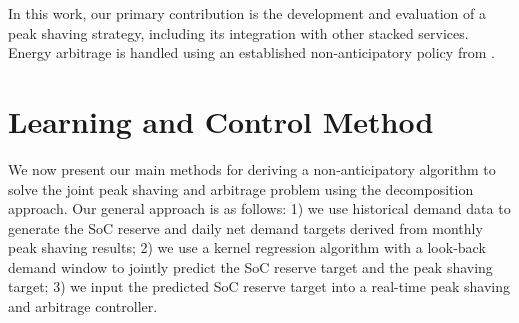 \documentclass[conference]{IEEEtran}
\begin{document}




In this work, our primary contribution is the development and evaluation of a peak shaving strategy, including its integration with other stacked services. Energy arbitrage is handled using an established non-anticipatory policy from \cite{baker2023transferable}.

\section{Learning and Control Method}\label{numerical_methods}
We now present our main methods for deriving a non-anticipatory algorithm to solve the joint peak shaving and arbitrage problem using the decomposition approach. Our general approach is as follows: 1) we use historical demand data to generate the SoC reserve and daily net demand targets derived from monthly peak shaving results; 2) we use a kernel regression algorithm with a look-back demand window to jointly predict the SoC reserve target and the peak shaving target; 3) we input the predicted SoC reserve target into a real-time peak shaving and arbitrage controller.
\end{document}
